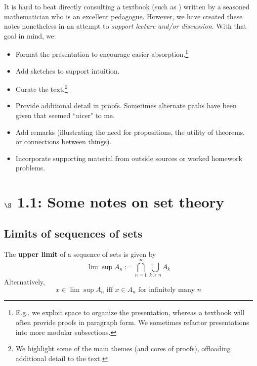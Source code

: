 \documentclass{article} %
\begin{document}
It is hard to beat directly consulting a textbook (such as \cite{ash2000probability}) written by a seasoned mathematician who is an excellent pedagogue. However, we have created these notes nonetheless in an attempt to \textit{support lecture and/or discussion}.   With that goal in mind, we:
\begin{itemize}
\item Format the presentation to encourage easier absorption.\footnote{E.g., we exploit space to organize the presentation, whereas a textbook will often provide proofs in paragraph form. We sometimes refactor presentations into more modular subsections.}
\item Add sketches to support intuition.
\item Curate the text.\footnote{We highlight some of the main themes (and cores of proofs), offloading additional detail to the text.} 
\item Provide additional detail in proofs.  Sometimes alternate paths have been given that seemed ``nicer" to me. 
\item Add remarks (illustrating the need for propositions, the utility of theorems, or connections between things).
\item Incorporate supporting material from outside sources or worked homework problems.
\end{itemize}





\section{$\S$ 1.1: Some notes on set theory}

\subsection{Limits of sequences of sets}

\begin{definition}
The \textbf{upper limit} of a sequence of sets is given by
\[ \lim\sup A_n := \bigcap_{n=1}^\infty \bigcup_{k \geq n} A_k \]
Alternatively,
\[ x \in \lim\sup A_n \text{ iff } x \in A_n \text{ for infinitely many } n \]
\label{def:upper_limit}
\end{definition}
\end{document}
